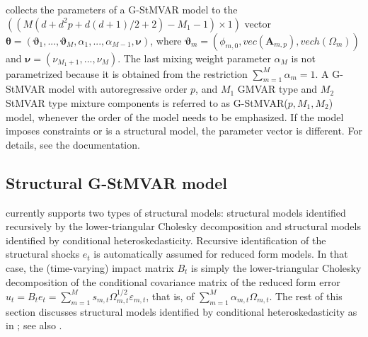 \documentclass[nojss]{jss}
\begin{document}
 collects the parameters of a G-StMVAR model to the $((M(d + d^2p + d(d+1)/2 + 2) - M_1 - 1)\times 1)$ vector $\boldsymbol{\theta}=(\boldsymbol{\vartheta}_1,...,\boldsymbol{\vartheta}_M,\alpha_1,...,\alpha_{M-1},\boldsymbol{\nu})$,  where $\boldsymbol{\vartheta}_m=(\phi_{m,0},vec(\boldsymbol{A}_{m,p}),vech(\Omega_m))$ and $\boldsymbol{\nu}=(\nu_{M_1+1},...,\nu_M)$.  The last mixing weight parameter $\alpha_M$ is not parametrized because it is obtained from the restriction $\sum_{m=1}^M \alpha_m = 1$.  A G-StMVAR model with autoregressive order $p$, and $M_1$ GMVAR type and $M_2$ StMVAR type mixture components is referred to as G-StMVAR($p,M_1,M_2$) model, whenever the order of the model needs to be emphasized. If the model imposes constraints or is a structural model, the parameter vector is different. For details, see the documentation.


\subsection{Structural G-StMVAR model}\label{sec:structural_model}

 currently supports two types of structural models: structural models identified recursively by the lower-triangular Cholesky decomposition and structural models identified by conditional heteroskedasticity. Recursive identification of the structural shocks $e_t$ is automatically assumed for reduced form models. In that case, the (time-varying) impact matrix $B_t$ is simply the lower-triangular Cholesky decomposition of the conditional covariance matrix of the reduced form error $u_t=B_te_t=\sum_{m=1}^Ms_{m,t}\Omega_{m,t}^{1/2}\varepsilon_{m,t}$, that is, of $\sum_{m=1}^M\alpha_{m,t}\Omega_{m,t}$. The rest of this section discusses structural models identified by conditional heteroskedasticity as in \cite{Virolainen:2024}; see also \cite{Virolainen2:2021}.
\end{document}
